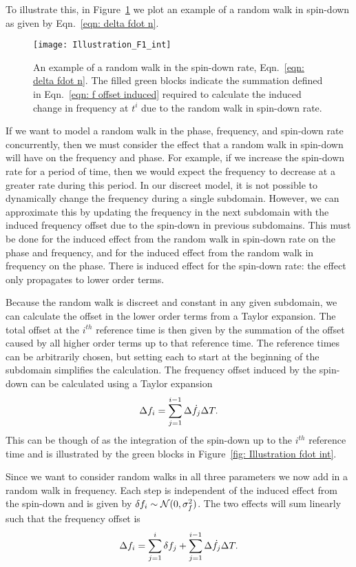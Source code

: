 \documentclass[../full_thesis/full_thesis.tex]{subfiles}
\begin{document}
To illustrate this, in Figure~\ref{fig: Illustration fdot int} we plot an example
of a random walk in spin-down as given by Eqn.~\eqref{eqn: delta fdot n}.
\begin{figure}[ht]
\centering
\texttt{[image: Illustration\_F1\_int]}
\caption{An example of a random walk in the spin-down rate, 
Eqn.~\eqref{eqn: delta fdot n}. The filled green blocks indicate the
summation defined in Eqn.~\eqref{eqn: f offset induced} required to
calculate the induced change in frequency at $t^{i}$ due to the random walk in
spin-down rate.}
\label{fig: Illustration fdot int}
\end{figure}

If we want to model a random walk in the phase, frequency, and spin-down rate
concurrently, then we must consider the effect that a
random walk in spin-down will have on the frequency and phase. For example, if we
increase the spin-down rate for a period of time, then we would expect the frequency
to decrease at a greater rate during this period. In our discreet model, it is
not possible to dynamically change the frequency during a single subdomain.
However, we can approximate this by updating the frequency in the next
subdomain with the induced frequency offset due to the spin-down in previous
subdomains. This must be done for the induced effect from the random walk in spin-down rate on
the phase and frequency, and for the induced effect from the random walk in frequency
on the phase. There is induced effect for the spin-down rate: the effect only
propagates to lower order terms.

Because the random walk is discreet and constant in any given subdomain, we can
calculate the offset in the lower order terms from a Taylor expansion. The
total offset at the  $i^{th}$ reference time is then given by the summation of
the offset caused by all higher order terms up to that reference time. The
reference times can be arbitrarily chosen, but setting each to start at the
beginning of the subdomain simplifies the calculation. 
The frequency offset induced by the spin-down can be
calculated using a Taylor expansion
\begin{equation}
\Delta f_{i} = \sum_{j=1}^{i-1}\Delta\dot{f}_{j} \Delta T .
\label{eqn: f offset induced} 
\end{equation}
This can be though of as the integration of the spin-down up to the $i^{th}$
reference time and is illustrated by the green blocks in Figure~\ref{fig:
Illustration fdot int}. 

Since we want to consider random walks in all three parameters we now add in a
random walk in frequency. Each step is independent of the induced effect from
the spin-down and is given by \mbox{$\delta f_{i} \sim \mathcal{N}(0, \sigma_{f}^{2})$}. The two
effects will sum linearly such that the frequency offset is
\begin{equation}
\Delta f_{i} = \sum_{j=1}^{i}\delta f_{j} + \sum_{j=1}^{i-1}\Delta\dot{f}_{j} \Delta T.
\label{eqn: f offset} 
\end{equation}
\end{document}
